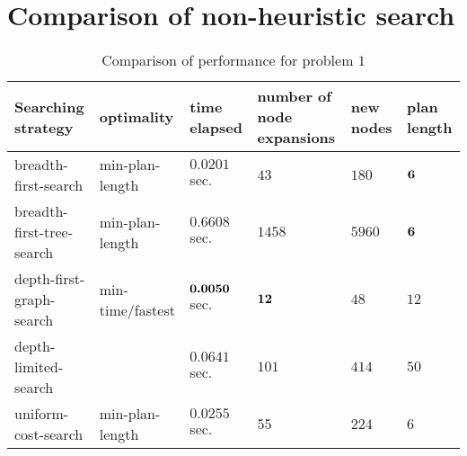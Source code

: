 \documentclass[11pt]{article}
\begin{document}
\section{Comparison of non-heuristic search}

\begin{table*}[h]
 \footnotesize 
 \centering
\begin{tabular*}{0.995\textwidth}{|m{97pt}<{\centering}|m{60pt}<{\centering}|m{60pt}<{\centering}|m{60pt}<{\centering}|m{60pt}<{\centering}|m{60pt}<{\centering}|}
\hline 
Searching strategy & optimality & time elapsed  & number of node expansions &  new nodes & plan length \\ 
\hline 
\vspace{5pt} breadth-first-search \vspace{5pt} & min-plan-length & $0.0201$ sec.  & $43$ & $180$  & $\boldsymbol{6}$ \\ 
\hline 
\vspace{5pt} breadth-first-tree-search \vspace{5pt} & min-plan-length  & $0.6608$ sec.  & $1458$ & $5960$  & $\boldsymbol{6}$ \\ 
\hline 
\vspace{5pt} depth-first-graph-search \vspace{5pt} &  min-time/fastest & $\boldsymbol{0.0050}$ sec.  & $\boldsymbol{12}$ & $48$  & $12$ \\ 
\hline 
\vspace{5pt} depth-limited-search \vspace{5pt} &  & $0.0641$ sec.  & $101$ & $414$  & $50$ \\ 
\hline 
\vspace{5pt} uniform-cost-search \vspace{5pt} &  min-plan-length   & $0.0255$ sec.  & $55$ & $224$  & $6$ \\ 
\hline 
\end{tabular*} \vspace{-5pt}
\caption{\footnotesize Comparison of performance for problem $1$} 
\label{tab: p1}
\end{table*}
\end{document}
